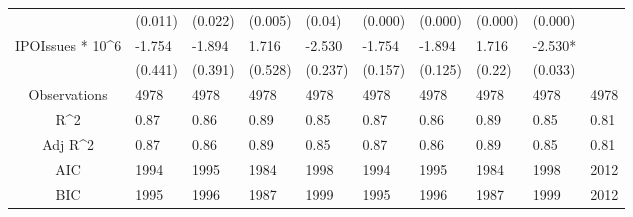 \documentclass{article}
\begin{document}
\begin{table}[H]
\begin{tabular}{|clllllllll|}
   & (0.011) & (0.022) & (0.005) & (0.04) & (0.000) & (0.000) & (0.000) & (0.000) &  \\ 
  IPOIssues * 10^6 & -1.754 & -1.894 & 1.716 & -2.530 & -1.754 & -1.894 & 1.716 & -2.530* &  \\ 
   & (0.441) & (0.391) & (0.528) & (0.237) & (0.157) & (0.125) & (0.22) & (0.033) &  \\ 
  \hline 
 Observations & 4978 & 4978 & 4978 & 4978 & 4978 & 4978 & 4978 & 4978 & 4978 \\ 
  R^2 & 0.87 & 0.86 & 0.89 & 0.85 & 0.87 & 0.86 & 0.89 & 0.85 & 0.81 \\ 
  Adj R^2 & 0.87 & 0.86 & 0.89 & 0.85 & 0.87 & 0.86 & 0.89 & 0.85 & 0.81 \\ 
  AIC & 1994 & 1995 & 1984 & 1998 & 1994 & 1995 & 1984 & 1998 & 2012 \\ 
  BIC & 1995 & 1996 & 1987 & 1999 & 1995 & 1996 & 1987 & 1999 & 2012 \\ 
   \hline
\end{tabular}
 
\end{table}
\end{document}
